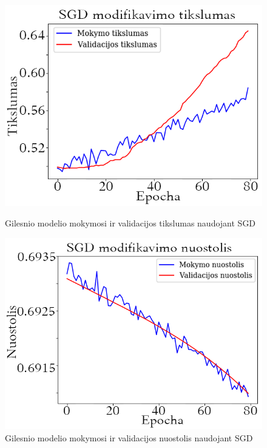 \documentclass{VUMIFPSkursinis}
\begin{document}
\begin{figure}[!htbp]
  \centering
  \begin{minipage}[b]{0.49\textwidth}
    \includegraphics[width=\textwidth]{img/AL/SGD_acc1.png}
    \caption{Gilesnio modelio mokymosi ir validacijos tikslumas naudojant SGD}
  \end{minipage}
  \begin{minipage}[b]{0.49\textwidth}
    \includegraphics[width=\textwidth]{img/AL/SGD_loss1.png}
    \caption{Gilesnio modelio mokymosi ir validacijos nuostolis naudojant SGD}
  \end{minipage}
\end{figure}
\end{document}

